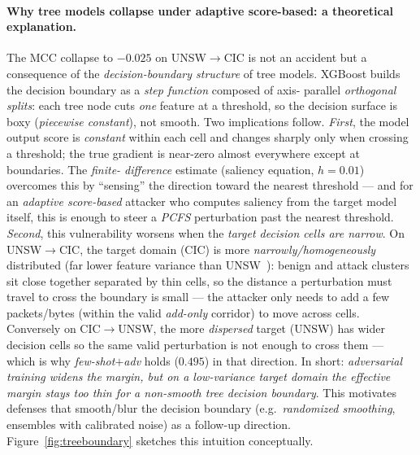 \documentclass[preprint,12pt,authoryear]{elsarticle}
\begin{document}
\paragraph{Why tree models collapse under adaptive score-based: a theoretical
explanation.} The MCC collapse to $-0.025$ on UNSW$\rightarrow$CIC is not an
accident but a consequence of the \emph{decision-boundary structure} of tree models.
XGBoost builds the decision boundary as a \emph{step function} composed of axis-
parallel \emph{orthogonal splits}: each tree node cuts \emph{one} feature at a
threshold, so the decision surface is boxy (\emph{piecewise constant}), not smooth.
Two implications follow. \emph{First}, the model output score is \emph{constant}
within each cell and changes sharply only when crossing a threshold; the true
gradient is near-zero almost everywhere except at boundaries. The \emph{finite-
difference} estimate (saliency equation, $h=0.01$) overcomes this by ``sensing'' the
direction toward the nearest threshold --- and for an \emph{adaptive score-based}
attacker who computes saliency from the target model itself, this is enough to steer
a \emph{PCFS} perturbation past the nearest threshold. \emph{Second}, this
vulnerability worsens when the \emph{target decision cells are narrow}. On
UNSW$\rightarrow$CIC, the target domain (CIC) is more \emph{narrowly/homogeneously}
distributed (far lower feature variance than UNSW~\citep{martono2024sfm}): benign and
attack clusters sit close together separated by thin cells, so the distance a
perturbation must travel to cross the boundary is small --- the attacker only needs
to add a few packets/bytes (within the valid \emph{add-only} corridor) to move
across cells. Conversely on CIC$\rightarrow$UNSW, the more \emph{dispersed} target
(UNSW) has wider decision cells so the same valid perturbation is not enough to
cross them --- which is why \emph{few-shot$+$adv} holds ($0.495$) in that direction.
In short: \emph{adversarial training widens the margin, but on a low-variance target
domain the effective margin stays too thin for a non-smooth tree decision boundary}.
This motivates defenses that smooth/blur the decision boundary (e.g.\ \emph{randomized
smoothing}, ensembles with calibrated noise) as a follow-up direction.
Figure~\ref{fig:treeboundary} sketches this intuition conceptually.
\end{document}
